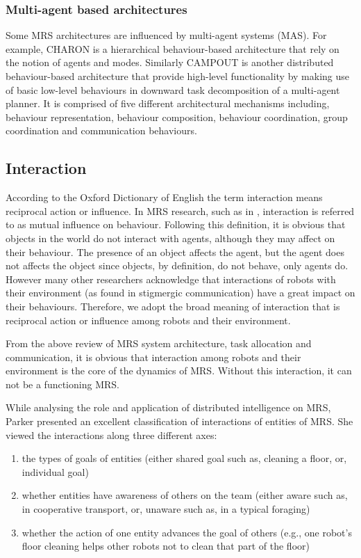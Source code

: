 \subsubsection*{Multi-agent based architectures}
Some MRS architectures are influenced by multi-agent systems (MAS). For example, CHARON is a hierarchical behaviour-based architecture that rely on  the notion of agents and modes. Similarly CAMPOUT is another distributed behaviour-based architecture that provide high-level functionality by making use of basic low-level behaviours in downward task decomposition of a multi-agent planner. It is comprised of five different architectural mechanisms including, behaviour representation, behaviour composition, behaviour coordination, group coordination and communication behaviours.

\subsection{Interaction}
According to the Oxford Dictionary of English the term interaction means reciprocal action or influence. In MRS research, such as in \cite{Mataric1994}, interaction is referred to as mutual influence on behaviour. Following this definition, it is obvious that objects in the world do not interact with agents, although they may affect on their behaviour. The presence of an object affects the agent, but the agent does not affects the object since objects, by definition, do not behave, only agents do. However many other researchers acknowledge that interactions of robots with their environment (as found in stigmergic communication) have a great impact on their behaviours. Therefore, we adopt the broad meaning of interaction that is  reciprocal action or influence among robots and their environment.

From the above review of MRS system architecture, task allocation and communication, it is obvious that interaction among robots and their environment is the core of the dynamics of MRS.
Without this interaction, it can not be a functioning MRS. 

While analysing the role and application of distributed intelligence on MRS, Parker \cite{Parker2008} presented an excellent classification of interactions of entities of MRS. She viewed the interactions along three different axes:
\begin{enumerate}
\item the types of goals of entities (either shared goal such as, cleaning a floor, or, individual goal)
\item whether entities have awareness of others on the team (either aware such as, in cooperative transport, or, unaware such as, in a typical foraging)
\item whether the action of one entity advances the goal of others (e.g., one robot's floor cleaning helps other robots not to clean that part of the floor)
\end{enumerate}

